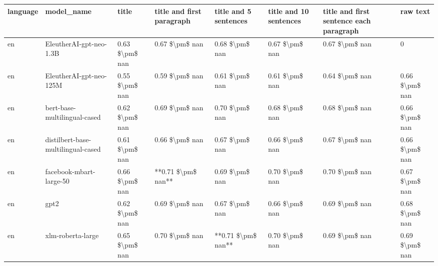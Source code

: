\begin{tabular}{llllllll}
\toprule
language &                         model\_name &          title & title and first paragraph & title and 5 sentences & title and 10 sentences & title and first sentence each paragraph &           raw text \\
\midrule
      en &            EleutherAI-gpt-neo-1.3B & 0.63 \$\textbackslash pm\$ nan &            0.67 \$\textbackslash pm\$ nan &        0.68 \$\textbackslash pm\$ nan &         0.67 \$\textbackslash pm\$ nan &                          0.67 \$\textbackslash pm\$ nan &                  0 \\
      en &            EleutherAI-gpt-neo-125M & 0.55 \$\textbackslash pm\$ nan &            0.59 \$\textbackslash pm\$ nan &        0.61 \$\textbackslash pm\$ nan &         0.61 \$\textbackslash pm\$ nan &                          0.64 \$\textbackslash pm\$ nan &     0.66 \$\textbackslash pm\$ nan \\
      en &       bert-base-multilingual-cased & 0.62 \$\textbackslash pm\$ nan &            0.69 \$\textbackslash pm\$ nan &        0.70 \$\textbackslash pm\$ nan &         0.68 \$\textbackslash pm\$ nan &                          0.68 \$\textbackslash pm\$ nan &     0.66 \$\textbackslash pm\$ nan \\
      en & distilbert-base-multilingual-cased & 0.61 \$\textbackslash pm\$ nan &            0.66 \$\textbackslash pm\$ nan &        0.67 \$\textbackslash pm\$ nan &         0.66 \$\textbackslash pm\$ nan &                          0.67 \$\textbackslash pm\$ nan &     0.66 \$\textbackslash pm\$ nan \\
      en &            facebook-mbart-large-50 & 0.66 \$\textbackslash pm\$ nan &        **0.71 \$\textbackslash pm\$ nan** &        0.69 \$\textbackslash pm\$ nan &         0.70 \$\textbackslash pm\$ nan &                          0.70 \$\textbackslash pm\$ nan &     0.67 \$\textbackslash pm\$ nan \\
      en &                               gpt2 & 0.62 \$\textbackslash pm\$ nan &            0.69 \$\textbackslash pm\$ nan &        0.67 \$\textbackslash pm\$ nan &         0.66 \$\textbackslash pm\$ nan &                          0.69 \$\textbackslash pm\$ nan &     0.68 \$\textbackslash pm\$ nan \\
      en &                  xlm-roberta-large & 0.65 \$\textbackslash pm\$ nan &            0.70 \$\textbackslash pm\$ nan &    **0.71 \$\textbackslash pm\$ nan** &         0.70 \$\textbackslash pm\$ nan &                          0.69 \$\textbackslash pm\$ nan &     0.69 \$\textbackslash pm\$ nan \\

\end{tabular}
